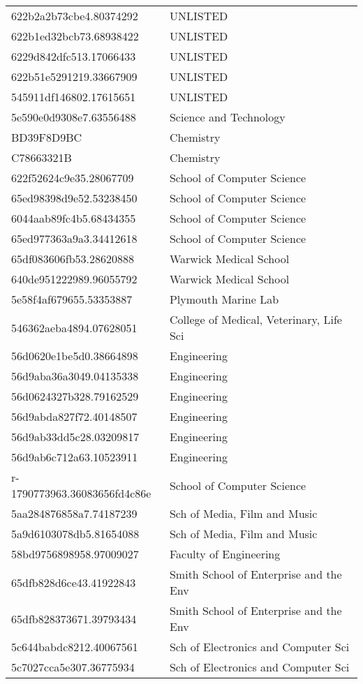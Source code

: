 \begin{tabular}{ll}
622b2a2b73cbe4.80374292 & UNLISTED \\
622b1ed32bcb73.68938422 & UNLISTED \\
6229d842dfc513.17066433 & UNLISTED \\
622b51e5291219.33667909 & UNLISTED \\
545911df146802.17615651 & UNLISTED \\
5e590e0d9308e7.63556488 & Science and Technology \\
BD39F8D9BC & Chemistry \\
C78663321B & Chemistry \\
622f52624c9e35.28067709 & School of Computer Science \\
65ed98398d9e52.53238450 & School of Computer Science \\
6044aab89fc4b5.68434355 & School of Computer Science \\
65ed977363a9a3.34412618 & School of Computer Science \\
65df083606fb53.28620888 & Warwick Medical School \\
640de951222989.96055792 & Warwick Medical School \\
5e58f4af679655.53353887 & Plymouth Marine Lab \\
546362aeba4894.07628051 & College of Medical, Veterinary, Life Sci \\
56d0620e1be5d0.38664898 & Engineering \\
56d9aba36a3049.04135338 & Engineering \\
56d0624327b328.79162529 & Engineering \\
56d9abda827f72.40148507 & Engineering \\
56d9ab33dd5c28.03209817 & Engineering \\
56d9ab6c712a63.10523911 & Engineering \\
r-1790773963.36083656fd4c86e & School of Computer Science \\
5aa284876858a7.74187239 & Sch of Media, Film and Music \\
5a9d6103078db5.81654088 & Sch of Media, Film and Music \\
58bd9756898958.97009027 & Faculty of Engineering \\
65dfb828d6ce43.41922843 & Smith School of Enterprise and the Env \\
65dfb828373671.39793434 & Smith School of Enterprise and the Env \\
5c644babdc8212.40067561 & Sch of Electronics and Computer Sci \\
5c7027cca5e307.36775934 & Sch of Electronics and Computer Sci \\

\end{tabular}
